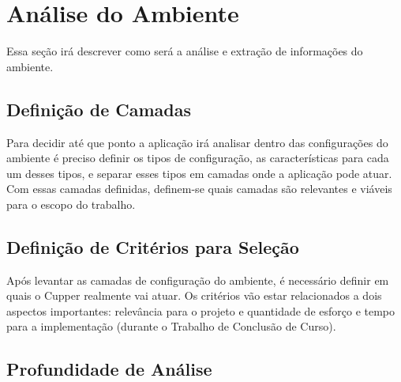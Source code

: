 \section{Análise do Ambiente}
Essa seção irá descrever como será a análise e extração de informações do ambiente. 


\subsection{Definição de Camadas}
Para decidir até que ponto a aplicação irá analisar dentro das configurações
do ambiente é preciso definir os tipos de configuração, as características para
cada um desses tipos, e separar esses tipos em camadas onde a aplicação pode atuar.
Com essas camadas definidas, definem-se quais camadas são relevantes e viáveis
para o escopo do trabalho.

\subsection{Definição de Critérios para Seleção}
Após levantar as camadas de configuração do ambiente, é necessário definir em quais o Cupper realmente vai atuar. Os critérios vão estar relacionados a dois aspectos importantes: relevância para o projeto e quantidade de esforço e tempo para a implementação (durante o Trabalho de Conclusão de Curso). 

\subsection{Profundidade de Análise}

